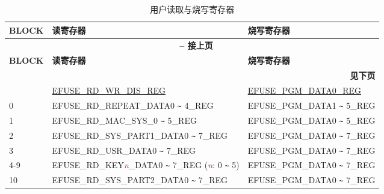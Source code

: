 \begin{longtable}[c]{|l|l|l|}
\caption{用户读取与烧写寄存器}
\label{tab:efuse-softw-read-para}
\\\hline
    \rowcolor{lightgray}
    \textbf{BLOCK} & \textbf{读寄存器} & \textbf{烧写寄存器}\\
    \endfirsthead    
    \multicolumn{3}{c}{\bfseries \tablename\ \thetable{} -- 接上页}\\\hline
    \rowcolor{lightgray}
    \textbf{BLOCK} & \textbf{读寄存器} & \textbf{烧写寄存器}\\
    \endhead
    \multicolumn{3}{r}{\textbf{见下页}} \\
    \endfoot
    \endlastfoot
    \hline
    0 & \hyperref[regdesc:EFUSERDWRDISREG]{EFUSE\_RD\_WR\_DIS\_REG} & \hyperref[regdesc:EFUSEPGMDATANREG]{EFUSE\_PGM\_DATA0\_REG} \\\hline
    0 & EFUSE\_RD\_REPEAT\_DATA0 \verb+~+ 4\_REG & EFUSE\_PGM\_DATA1 \verb+~+ 5\_REG \\\hline
    1 & EFUSE\_RD\_MAC\_SYS\_0 \verb+~+ 5\_REG & EFUSE\_PGM\_DATA0 \verb+~+ 5\_REG \\\hline
    2 & EFUSE\_RD\_SYS\_PART1\_DATA0 \verb+~+ 7\_REG & EFUSE\_PGM\_DATA0 \verb+~+ 7\_REG \\\hline
    3 & EFUSE\_RD\_USR\_DATA0 \verb+~+ 7\_REG & EFUSE\_PGM\_DATA0 \verb+~+ 7\_REG \\ \hline
    4-9 & EFUSE\_RD\_KEY\textcolor{red}{\it{n}}\_DATA0 \verb+~+ 7\_REG (\textcolor{red}{\it{n}}: 0 \verb+~+ 5) & EFUSE\_PGM\_DATA0 \verb+~+ 7\_REG \\\hline
    10 & EFUSE\_RD\_SYS\_PART2\_DATA0 \verb+~+ 7\_REG & EFUSE\_PGM\_DATA0 \verb+~+ 7\_REG \\\hline
\end{longtable}
